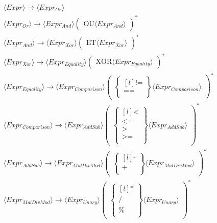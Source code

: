 \begin{align*}
&⟨Expr⟩ \to ⟨Expr_{Or}⟩
\\
&⟨Expr_{Or}⟩ \to ⟨Expr_{And}⟩\begin{pmatrix}
    \text{OU}
    ⟨Expr_{And}⟩
\end{pmatrix}^*
\\
&⟨Expr_{And}⟩ \to ⟨Expr_{Xor}⟩\begin{pmatrix}
    \text{ET}
    ⟨Expr_{Xor}⟩
\end{pmatrix}^*
\\
&⟨Expr_{Xor}⟩ \to ⟨Expr_{Equality}⟩\begin{pmatrix}
    \text{XOR}
    ⟨Expr_{Equality}⟩
\end{pmatrix}^*
\\
&⟨Expr_{Equality}⟩ \to ⟨Expr_{Comparison}⟩\begin{pmatrix}
\begin{Bmatrix*}[l]
    \text{!=} \\
    \text{==} \\
\end{Bmatrix*}
⟨Expr_{Comparison}⟩\end{pmatrix}^*
\\
&⟨Expr_{Comparison}⟩ \to ⟨Expr_{AddSub}⟩\begin{pmatrix}
\begin{Bmatrix*}[l]
    \text{<} \\
    \text{<=} \\
    \text{>} \\
    \text{>=} \\
\end{Bmatrix*}
⟨Expr_{AddSub}⟩\end{pmatrix}^*
\\
&⟨Expr_{AddSub}⟩ \to ⟨Expr_{MulDivMod}⟩\begin{pmatrix}
\begin{Bmatrix*}[l]
    \text{-} \\
    \text{+} \\
\end{Bmatrix*}
⟨Expr_{MulDivMod}⟩\end{pmatrix}^*
\\
&⟨Expr_{MulDivMod}⟩ \to ⟨Expr_{Unary}⟩\begin{pmatrix}
\begin{Bmatrix*}[l]
    \text{*} \\
    \text{/} \\
    \text{\%} \\
\end{Bmatrix*}
⟨Expr_{Unary}⟩\end{pmatrix}^*

\end{align*}

